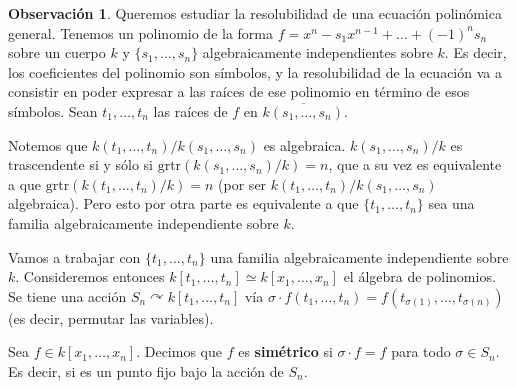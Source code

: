 \documentclass[12pt]{book}
\theoremstyle{definition}
\newtheorem{obs}[teo]{Observación}
\def\acts{\curvearrowright}
\begin{document}
\begin{obs}
Queremos estudiar la resolubilidad de una ecuación polinómica general. Tenemos un polinomio de la forma $f = x^n - s_1x^{n-1} + \ldots + (-1)^n s_n$ sobre un cuerpo $k$ y $\{s_1,\ldots ,s_n\}$ algebraicamente independientes sobre $k$. Es decir, los coeficientes del polinomio son símbolos, y la resolubilidad de la ecuación va a consistir en poder expresar a las raíces de ese polinomio en término de esos símbolos. Sean $t_1,\ldots , t_n$ las raíces de $f$ en $\overline{k(s_1,\ldots , s_n)}$.

Notemos que $k(t_1,\ldots ,t_n)/k(s_1,\ldots ,s_n)$ es algebraica. $k(s_1,\ldots , s_n)/k$ es trascendente si y sólo si $\mathrm{grtr}(k(s_1,\ldots ,s_n)/k) = n$, que a su vez es equivalente a que $\mathrm{grtr}(k(t_1,\ldots , t_n)/k)=n$ (por ser $k(t_1,\ldots , t_n)/k(s_1,\ldots , s_n)$ algebraica). Pero esto por otra parte es equivalente a que $\{t_1,\ldots ,t_n\}$ sea una familia algebraicamente independiente sobre $k$.

Vamos a trabajar con $\{t_1,\ldots , t_n\}$ una familia algebraicamente independiente sobre $k$. Consideremos entonces $k[t_1,\ldots, t_n]\simeq k[x_1,\ldots , x_n]$ el álgebra de polinomios. Se tiene una acción $S_n\acts k[t_1,\ldots , t_n]$ vía $\sigma \cdot f(t_1,\ldots , t_n) = f(t_{\sigma(1)},\ldots , t_{\sigma(n)})$ (es decir, permutar las variables).

Sea $f\in k[x_1,\ldots , x_n]$. Decimos que $f$ es \textbf{simétrico} si $\sigma\cdot f = f$ para todo $\sigma\in S_n$. Es decir, si es un punto fijo bajo la acción de $S_n$.


\end{obs}
\end{document}
